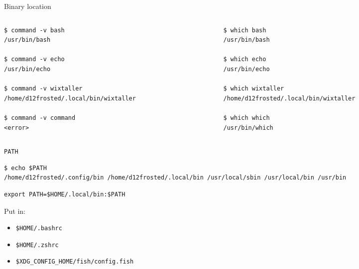 \documentclass[presentation,aspectratio=169,smaller]{beamer}
\begin{document}
\begin{frame}[label={sec:orgca34690},fragile]{Binary location}
 \begin{columns}
\begin{column}{0.5\columnwidth}
\begin{verbatim}
$ command -v bash
/usr/bin/bash

$ command -v echo
/usr/bin/echo

$ command -v wixtaller
/home/d12frosted/.local/bin/wixtaller

$ command -v command
<error>
\end{verbatim}
\end{column}

\begin{column}{0.5\columnwidth}
\begin{verbatim}
$ which bash
/usr/bin/bash

$ which echo
/usr/bin/echo

$ which wixtaller
/home/d12frosted/.local/bin/wixtaller

$ which which
/usr/bin/which
\end{verbatim}
\end{column}
\end{columns}
\end{frame}

\begin{frame}[label={sec:org4d510fc},fragile]{\texttt{PATH}}
 \begin{verbatim}
$ echo $PATH
/home/d12frosted/.config/bin /home/d12frosted/.local/bin /usr/local/sbin /usr/local/bin /usr/bin
\end{verbatim}

\begin{verbatim}
export PATH=$HOME/.local/bin:$PATH
\end{verbatim}

Put in:

\begin{itemize}
\item \texttt{\$HOME/.bashrc}
\item \texttt{\$HOME/.zshrc}
\item \texttt{\$XDG\_CONFIG\_HOME/fish/config.fish}
\end{itemize}
\end{frame}
\end{document}
